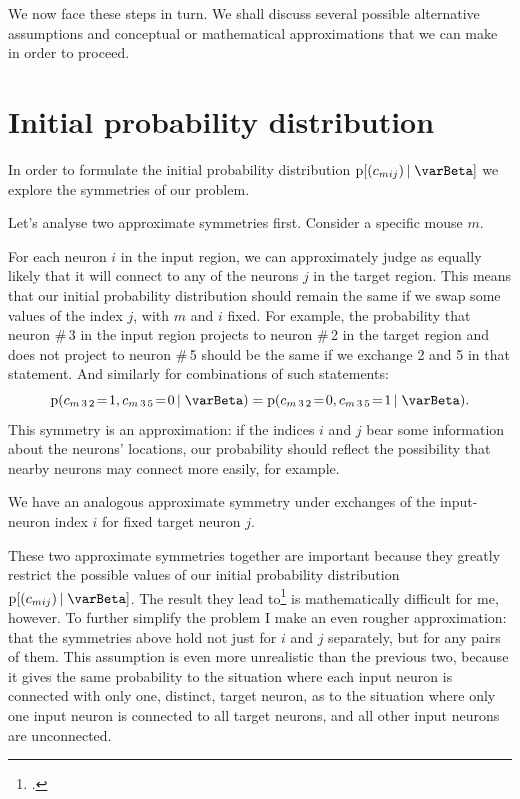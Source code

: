 \documentclass[\ifafour a4paper,12pt,\else a5paper,10pt,\fi%
onecolumn,oneside,article,%
british%
]{memoir}
\theoremstyle{remark}
\theoremstyle{innote}
\newcommand*{\citep}{\footcites}
\newcommand*{\pf}{\mathrm{p}}%
\renewcommand*{\|}[1][]{\nonscript\,#1\vert\nonscript\;\mathopen{}}
\newcommand*{\yI}{\varBeta}
\newcommand*{\yc}{c}
\newcommand*{\eq}{\mathrel{\!=\!}}
\begin{document}
We now face these steps in turn. We shall discuss several possible
alternative assumptions and conceptual or mathematical approximations that
we can make in order to proceed.

\section{Initial probability distribution}
\label{sec:init_prob}

In order to formulate the initial probability distribution $\pf[(\yc_{mij})
\| \yI]$ we explore the symmetries of our problem.

Let's analyse two approximate symmetries first. Consider a specific mouse
$m$.

For each neuron $i$ in the input region, we can approximately judge as
equally likely that it will connect to any of the neurons $j$ in the target
region. This means that our initial probability distribution should remain
the same if we swap some values of the index $j$, with $m$ and $i$ fixed.
For example, the probability that neuron \#\,3 in the input region projects
to neuron \#\,2 in the target region and does not project to neuron \#\,5
should be the same if we exchange 2 and 5 in that statement. And similarly
for combinations of such statements:
\begin{equation}
  \label{eq:example_exch_j}
  \pf(\yc_{m\,3\,2} \eq 1, \yc_{m\,3\,5} \eq 0 \| \yI )
=  \pf(\yc_{m\,3\,2} \eq 0, \yc_{m\,3\,5} \eq 1 \| \yI ).
\end{equation}
This symmetry is an approximation: if the indices $i$ and $j$ bear some
information about the neurons' locations, our probability should reflect
the possibility that nearby neurons may connect more easily, for example.

We have an analogous approximate symmetry under exchanges of the
input-neuron index $i$ for fixed target neuron $j$.

These two approximate symmetries together are important because they
greatly restrict the possible values of our initial probability
distribution $\pf[(\yc_{mij}) \| \yI]$. The result they lead
to\citep{hoover1979,aldous1981,diaconisetal1981b} is mathematically
difficult for me, however. To further simplify the problem I make an even
rougher approximation: that the symmetries above hold not just for $i$ and
$j$ separately, but for any pairs of them. This assumption is even more
unrealistic than the previous two, because it gives the same probability to
the situation where each input neuron is connected with only one, distinct,
target neuron, as to the situation where only one input neuron is connected
to all target neurons, and all other input neurons are unconnected.
\end{document}

